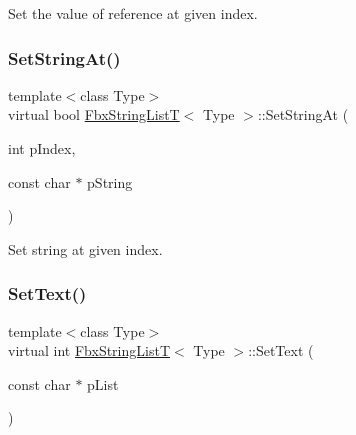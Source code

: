 Set the value of reference at given index. 

\mbox{\label{class_fbx_string_list_t_a4b757a856d12717cfcf854e767af54f1}} 
\subsubsection{\texorpdfstring{Set\+String\+At()}{SetStringAt()}}
{\footnotesize\ttfamily template$<$class Type$>$ \\
virtual bool \hyperlink{class_fbx_string_list_t}{Fbx\+String\+ListT}$<$ Type $>$\+::Set\+String\+At (\begin{DoxyParamCaption}\item[{int}]{p\+Index,  }\item[{const char $\ast$}]{p\+String }\end{DoxyParamCaption})\hspace{0.3cm}{\ttfamily [virtual]}}



Set string at given index. 

\mbox{\label{class_fbx_string_list_t_a02f67be1bc4175ece4f9aa62efc17441}} 
\subsubsection{\texorpdfstring{Set\+Text()}{SetText()}}
{\footnotesize\ttfamily template$<$class Type$>$ \\
virtual int \hyperlink{class_fbx_string_list_t}{Fbx\+String\+ListT}$<$ Type $>$\+::Set\+Text (\begin{DoxyParamCaption}\item[{const char $\ast$}]{p\+List }\end{DoxyParamCaption})\hspace{0.3cm}{\ttfamily [virtual]}}

